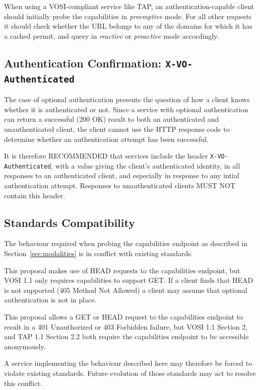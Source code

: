 \documentclass[11pt,a4paper]{ivoa}
\newcommand{\header}[1]{{\tt #1}}
\begin{document}
When using a VOSI-compliant service like TAP,
an authentication-capable client should initially probe
the capabilities in {\em preemptive\/} mode.
For all other requests it should check whether the URL
belongs to any of the domains for which it has a cached permit,
and query in {\em reactive\/} or {\em proactive\/} mode accordingly.


\subsection{Authentication Confirmation: {\tt X-VO-Authenticated}}

The case of optional authentication presents the question
of how a client knows whether it is authenticated or not.
Since a service with optional authentication can return
a successful (200 OK) result to both an authenticated and unauthenticated
client,
the client cannot use the HTTP response code to determine whether
an authentication attempt has been successful.

It is therefore RECOMMENDED that services include the header
\header{X-VO-Authenticated}, with a value giving the client's
authenticated identity, in all responses to an authenticated client,
and especially in response to any intial authentication attempt.
Responses to unauthenticated clients MUST NOT contain this header.



\subsection{Standards Compatibility}

The behaviour required when probing the capabilities endpoint
as described in Section~\ref{sec:modalities}
is in conflict with existing standards.

This proposal makes use of HEAD requests to the capabilities endpoint,
but VOSI 1.1 only requires capabilities to support GET.
If a client finds that HEAD is not supported (405 Method Not Allowed)
a client may assume that optional authentication is not in place.

This proposal allows a GET or HEAD request to the capabilities endpoint
to result in a 401 Unauthorized or 403 Forbidden failure,
but VOSI 1.1 Section 2, and TAP 1.1 Section 2.2 both require
the capabilities endpoint to be accessible anonymously.

A service implementing the behaviour described here may therefore
be forced to violate existing standards.  Future evolution of those
standards may act to resolve this conflict.
\end{document}
